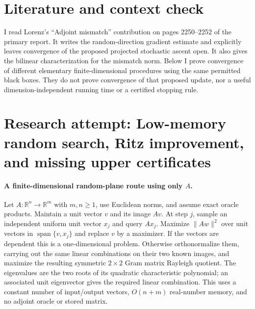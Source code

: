 \documentclass[11pt]{article}
\begin{document}
\section{Literature and context check}

I read Lorenz's ``Adjoint mismatch'' contribution on pages 2250--2252 of the
primary report. It writes the random-direction gradient estimate and explicitly
leaves convergence of the proposed projected stochastic ascent open. It also
gives the bilinear characterization for the mismatch norm. Below I prove
convergence of different elementary finite-dimensional procedures using the same
permitted black boxes. They do not prove convergence of that proposed update,
nor a useful dimension-independent running time or a certified stopping rule.

\section{Research attempt: Low-memory random search, Ritz improvement, and missing upper certificates}

\paragraph{A finite-dimensional random-plane route using only $A$.}
Let $A:\mathbb R^n\to\mathbb R^m$ with $m,n\geq1$, use Euclidean norms,
and assume exact oracle products. Maintain a unit vector $v$ and its image
$Av$. At step $j$, sample an independent uniform unit vector $x_j$ and query
$Ax_j$. Maximize $\|Aw\|^2$ over unit vectors in
$\operatorname{span}\{v,x_j\}$ and replace $v$ by a maximizer.
If the vectors are dependent this is a one-dimensional problem. Otherwise
orthonormalize them, carrying out the same linear combinations on their two
known images, and maximize the resulting symmetric $2\times2$ Gram matrix
Rayleigh quotient. The eigenvalues are the two roots of its quadratic
characteristic polynomial; an associated unit eigenvector gives the required
linear combination. This uses a constant number of input/output vectors,
$O(n+m)$ real-number memory, and no adjoint oracle or stored matrix.
\end{document}
